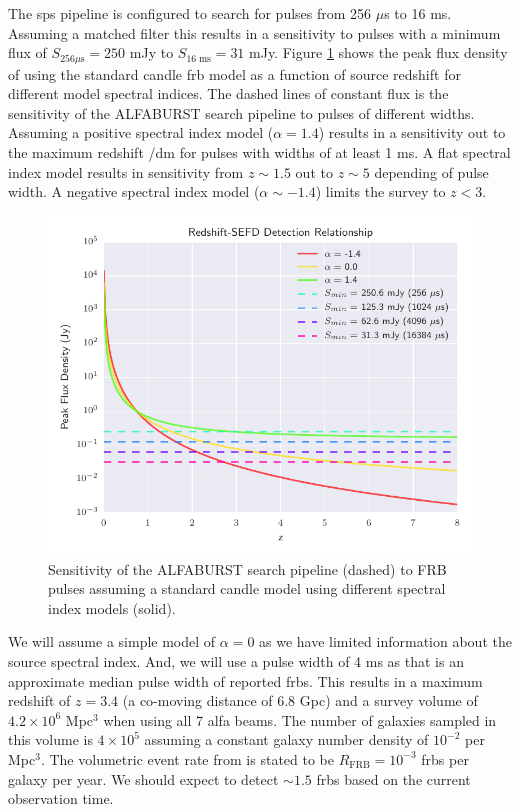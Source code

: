 \documentclass[a4paper,fleqn,usenatbib]{mnras}
\begin{document}
The \gls{sps} pipeline is configured to search for pulses from 256 $\mu$s to 16
ms. Assuming a matched filter this results in a sensitivity to pulses with a
minimum flux of $S_{256 \mu\textrm{s}} = 250$ mJy to $S_{16 \; \textrm{ms}} =
31$ mJy. Figure \ref{fig:fwhm_sefd_z} shows the peak flux density of using the
standard candle \gls{frb} model as a function of source redshift for different
model spectral indices. The dashed lines of constant flux is the sensitivity of
the ALFABURST search pipeline to pulses of different widths. Assuming a positive
spectral index model ($\alpha=1.4$) results in a sensitivity out to the maximum
redshift /\gls{dm} for pulses with widths of at least 1 ms. A flat spectral
index model results in sensitivity from $z \sim 1.5$ out to $z \sim 5$ depending
of pulse width. A negative spectral index model ($\alpha \sim -1.4$) limits the
survey to $z < 3$.

\begin{figure}
    \includegraphics[width=1.0\linewidth]{figures/fwhm_sefd_z_relation.pdf}
    \caption{Sensitivity of the ALFABURST search pipeline (dashed) to FRB pulses
    assuming a standard candle model using different spectral index models
    (solid).
    }
    \label{fig:fwhm_sefd_z}
\end{figure}

We will assume a simple model of $\alpha=0$ as we have limited information about
the source spectral index. And, we will use a pulse width of 4 ms as that is an
approximate median pulse width of reported \glspl{frb}. This results in a
maximum redshift of $z=3.4$ (a co-moving distance of 6.8 Gpc) and a survey volume
of $4.2 \times 10^6$ Mpc$^3$ when using all 7 \gls{alfa} beams. The number of
galaxies sampled in this volume is $4 \times 10^5$ assuming a constant galaxy
number density of $10^{-2}$ per Mpc$^3$.  The volumetric event rate from
\cite{2013Sci...341...53T} is stated to be $R_{\textrm{FRB}} = 10^{-3}$
\glspl{frb} per galaxy per year. We should expect to detect $\sim 1.5$
\glspl{frb} based on the current observation time.
\end{document}
